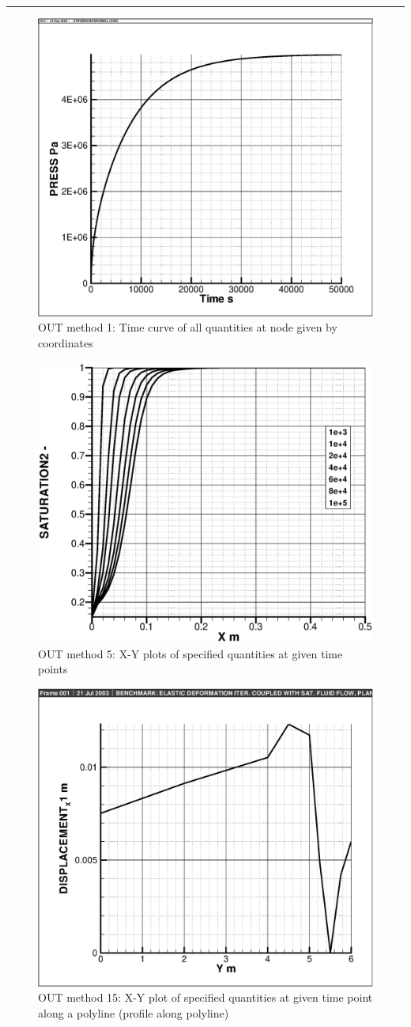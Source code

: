\hrule


\begin{figure}[htb!]
\begin{center}
\footnotesize
\vspace{-0.2cm}
\includegraphics[width=0.5\columnwidth]{figures/out_method1.eps}  %
\caption{
OUT method 1: Time curve of all quantities at node given by coordinates
}
\end{center}
\end{figure}

\begin{figure}[htb!]
\begin{center}
\footnotesize
\vspace{-0.2cm}
\includegraphics[width=0.5\columnwidth]{figures/out_method5.eps}  %
\caption{
OUT method 5: X-Y plots of specified quantities at given time points
}
\end{center}
\end{figure}

\begin{figure}[htb!]
\begin{center}
\footnotesize
\vspace{-0.2cm}
\includegraphics[width=0.5\columnwidth]{figures/out_method15.eps}  %
\caption{
OUT method 15: X-Y plot of specified quantities at given time point along a polyline
(profile along polyline)
}
\end{center}
\end{figure}


\vfill
{}
